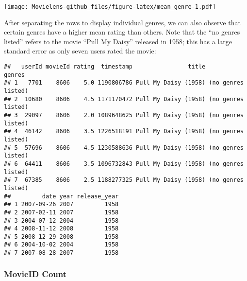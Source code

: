 \documentclass[]{article}
\newenvironment{Shaded}{\begin{snugshade}}{\end{snugshade}}
\newcommand{\DataTypeTok}[1]{\textcolor[rgb]{0.13,0.29,0.53}{#1}}
\newcommand{\DecValTok}[1]{\textcolor[rgb]{0.00,0.00,0.81}{#1}}
\newcommand{\KeywordTok}[1]{\textcolor[rgb]{0.13,0.29,0.53}{\textbf{#1}}}
\newcommand{\NormalTok}[1]{#1}
\newcommand{\OperatorTok}[1]{\textcolor[rgb]{0.81,0.36,0.00}{\textbf{#1}}}
\newcommand{\StringTok}[1]{\textcolor[rgb]{0.31,0.60,0.02}{#1}}
\begin{document}
\texttt{[image: Movielens-github\_files/figure-latex/mean\_genre-1.pdf]}

After separating the rows to display individual genres, we can also
observe that certain genres have a higher mean rating than others. Note
that the ``no genres listed'' refers to the movie ``Pull My Daisy''
released in 1958; this has a large standard error as only seven users
rated the movie:

\begin{Shaded}
\end{Shaded}

\begin{verbatim}
##   userId movieId rating  timestamp                title             genres
## 1   7701    8606    5.0 1190806786 Pull My Daisy (1958) (no genres listed)
## 2  10680    8606    4.5 1171170472 Pull My Daisy (1958) (no genres listed)
## 3  29097    8606    2.0 1089648625 Pull My Daisy (1958) (no genres listed)
## 4  46142    8606    3.5 1226518191 Pull My Daisy (1958) (no genres listed)
## 5  57696    8606    4.5 1230588636 Pull My Daisy (1958) (no genres listed)
## 6  64411    8606    3.5 1096732843 Pull My Daisy (1958) (no genres listed)
## 7  67385    8606    2.5 1188277325 Pull My Daisy (1958) (no genres listed)
##         date year release_year
## 1 2007-09-26 2007         1958
## 2 2007-02-11 2007         1958
## 3 2004-07-12 2004         1958
## 4 2008-11-12 2008         1958
## 5 2008-12-29 2008         1958
## 6 2004-10-02 2004         1958
## 7 2007-08-28 2007         1958
\end{verbatim}

\hypertarget{movieid-count}{%
\subsubsection{MovieID Count}\label{movieid-count}}

\begin{Shaded}
\end{Shaded}
\end{document}
